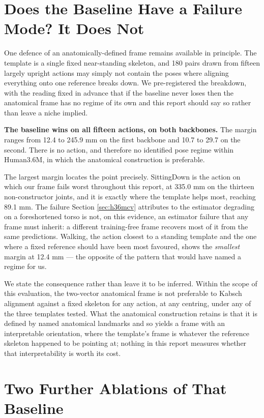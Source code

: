 \section{Does the Baseline Have a Failure Mode? It Does Not}
\label{sec:templateaction}

One defence of an anatomically-defined frame remains available in principle. The template is a single fixed near-standing skeleton, and 180 pairs drawn from fifteen largely upright actions may simply not contain the poses where aligning everything onto one reference breaks down. We pre-registered the breakdown, with the reading fixed in advance that if the baseline never loses then the anatomical frame has no regime of its own and this report should say so rather than leave a niche implied.

\textbf{The baseline wins on all fifteen actions, on both backbones.} The margin ranges from 12.4 to 245.9 mm on the first backbone and 10.7 to 29.7 on the second. There is no action, and therefore no identified pose regime within Human3.6M, in which the anatomical construction is preferable.

The largest margin locates the point precisely. SittingDown is the action on which our frame fails worst throughout this report, at 335.0 mm on the thirteen non-constructor joints, and it is exactly where the template helps most, reaching 89.1 mm. The failure Section \ref{sec:h36mcv} attributes to the estimator degrading on a foreshortened torso is not, on this evidence, an estimator failure that any frame must inherit: a different training-free frame recovers most of it from the same predictions. Walking, the action closest to a standing template and the one where a fixed reference should have been most favoured, shows the \emph{smallest} margin at 12.4 mm --- the opposite of the pattern that would have named a regime for us.

We state the consequence rather than leave it to be inferred. Within the scope of this evaluation, the two-vector anatomical frame is not preferable to Kabsch alignment against a fixed skeleton for any action, at any centring, under any of the three templates tested. What the anatomical construction retains is that it is defined by named anatomical landmarks and so yields a frame with an interpretable orientation, where the template's frame is whatever the reference skeleton happened to be pointing at; nothing in this report measures whether that interpretability is worth its cost.

\section{Two Further Ablations of That Baseline}
\label{sec:templateablation}

